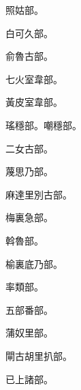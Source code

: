 \begin{pinyinscope}
 照姑部。



 白可久部。



 俞魯古部。



 七火室韋部。



 黃皮室韋部。



 瑤穩部。嘲穩部。



 二女古部。



 蔑思乃部。



 麻達里別古部。



 梅裏急部。



 斡魯部。



 榆裏底乃部。



 率類部。



 五部番部。



 蒲奴里部。



 閘古胡里扒部。



 已上諸部。



\end{pinyinscope}